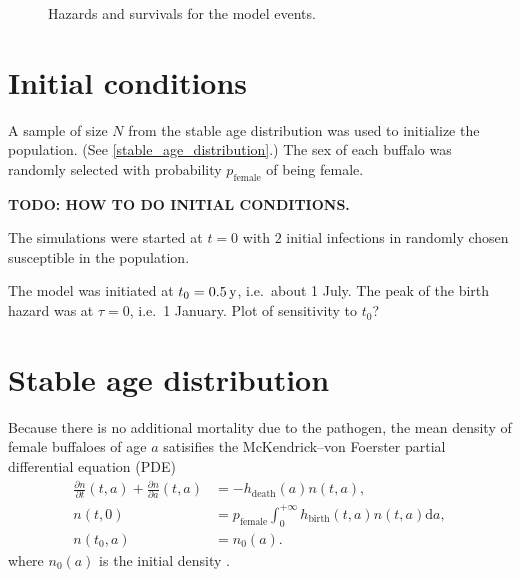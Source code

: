 \documentclass[12pt]{article}
\newcommand{\md}{\mathrm{d}}
\begin{document}
\begin{figure}
  \centering
  \begin{sansmath}
    
  \end{sansmath}
  \caption{Hazards and survivals for the model events.}
  \label{fig:distributions}
\end{figure}


\section{Initial conditions}

A sample of size $N$ from the stable age distribution was used to
initialize the population.  (See \autoref{stable_age_distribution}.)
The sex of each buffalo was randomly selected with probability
$p_{\text{female}}$ of being female.

\textbf{TODO: HOW TO DO INITIAL CONDITIONS.}

\cite{hedger_1972}

The simulations were started at $t = 0$ with $2$ initial infections
in randomly chosen susceptible in the population.

The model was initiated at $t_0 = \unit[0.5]{y}$, i.e.~about 1 July.
The peak of the birth hazard was at $\tau = 0$, i.e.~1 January.
Plot of sensitivity to $t_0$?

\section{Stable age distribution}
\label{stable_age_distribution}

Because there is no additional mortality due to the pathogen, the mean
density of female buffaloes of age $a$ satisifies the McKendrick--von
Foerster partial differential equation (PDE)
\begin{equation}
  \label{PDE}
  \begin{split}
    \frac{\partial n}{\partial t}(t, a)
    + \frac{\partial n}{\partial a}(t, a)
    &= - h_{\text{death}}(a) n(t, a),
    \\
    n(t, 0) &=
    p_{\text{female}}
    \int_0^{+\infty} h_{\text{birth}}(t, a) n(t, a) \md a,
    \\
    n(t_0, a) &= n_0(a).
  \end{split}
\end{equation}
where $n_0(a)$ is the initial density
\autocite{harris_1963, kot_01}.
\end{document}

